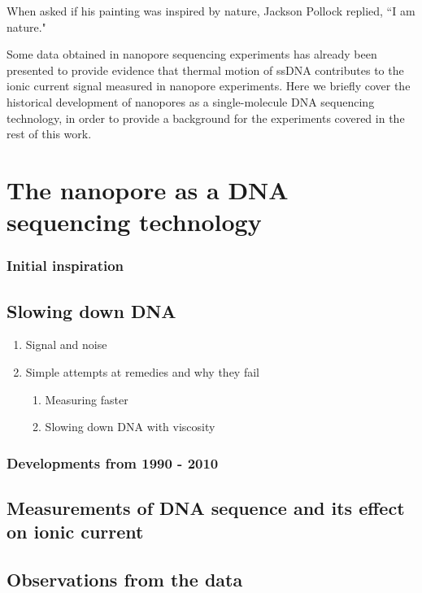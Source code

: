 \begin{savequote}[75mm]
When asked if his painting was inspired by nature, Jackson Pollock replied, ``I am nature."
\end{savequote}

Some data obtained in nanopore sequencing experiments has already been presented to provide evidence that thermal motion of ssDNA contributes to the ionic current signal measured in nanopore experiments.  Here we briefly cover the historical development of nanopores as a single-molecule DNA sequencing technology, in order to provide a background for the experiments covered in the rest of this work.

\chapter{The nanopore as a DNA sequencing technology}
\label{dna_sequencing}

\subsection{Initial inspiration}

\section{Slowing down DNA}
\begin{enumerate}
\item Signal and noise
\item Simple attempts at remedies and why they fail
\begin{enumerate}
\item Measuring faster
\item Slowing down DNA with viscosity
\end{enumerate}
\end{enumerate}

\subsection{Developments from 1990 - 2010}

\section{Measurements of DNA sequence and its effect on ionic current}

\section{Observations from the data}

